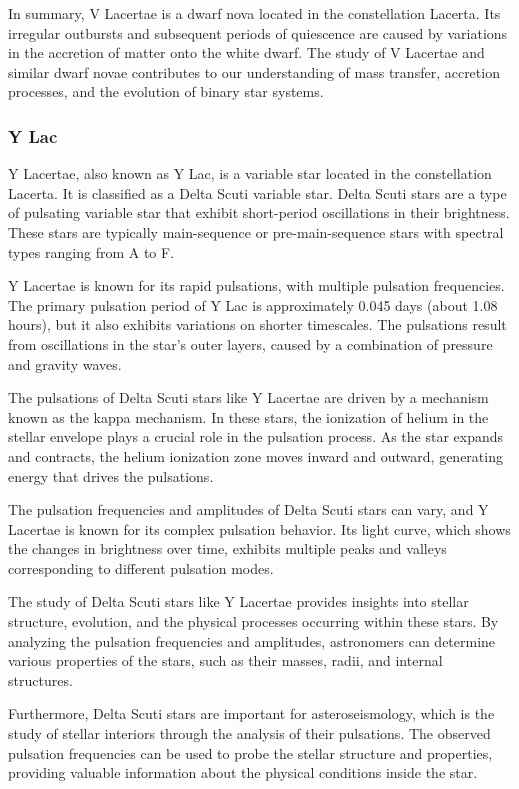 In summary, V Lacertae is a dwarf nova located in the constellation Lacerta. Its irregular outbursts and subsequent periods of quiescence are caused by variations in the accretion of matter onto the white dwarf. The study of V Lacertae and similar dwarf novae contributes to our understanding of mass transfer, accretion processes, and the evolution of binary star systems.



\subsubsection*{ Y Lac }
Y Lacertae, also known as Y Lac, is a variable star located in the constellation Lacerta. It is classified as a Delta Scuti variable star. Delta Scuti stars are a type of pulsating variable star that exhibit short-period oscillations in their brightness. These stars are typically main-sequence or pre-main-sequence stars with spectral types ranging from A to F.

Y Lacertae is known for its rapid pulsations, with multiple pulsation frequencies. The primary pulsation period of Y Lac is approximately 0.045 days (about 1.08 hours), but it also exhibits variations on shorter timescales. The pulsations result from oscillations in the star's outer layers, caused by a combination of pressure and gravity waves.

The pulsations of Delta Scuti stars like Y Lacertae are driven by a mechanism known as the kappa mechanism. In these stars, the ionization of helium in the stellar envelope plays a crucial role in the pulsation process. As the star expands and contracts, the helium ionization zone moves inward and outward, generating energy that drives the pulsations.

The pulsation frequencies and amplitudes of Delta Scuti stars can vary, and Y Lacertae is known for its complex pulsation behavior. Its light curve, which shows the changes in brightness over time, exhibits multiple peaks and valleys corresponding to different pulsation modes.

The study of Delta Scuti stars like Y Lacertae provides insights into stellar structure, evolution, and the physical processes occurring within these stars. By analyzing the pulsation frequencies and amplitudes, astronomers can determine various properties of the stars, such as their masses, radii, and internal structures.

Furthermore, Delta Scuti stars are important for asteroseismology, which is the study of stellar interiors through the analysis of their pulsations. The observed pulsation frequencies can be used to probe the stellar structure and properties, providing valuable information about the physical conditions inside the star.

